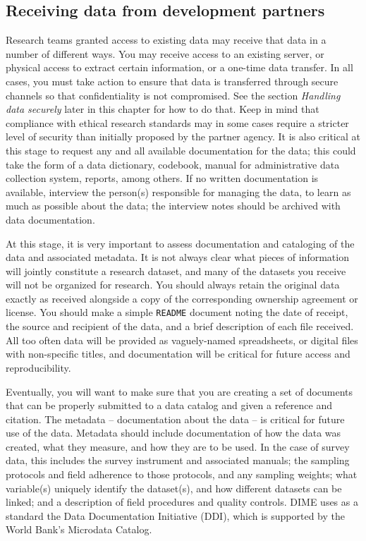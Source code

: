 \subsection{Receiving data from development partners}

Research teams granted access to existing data may receive that data in a number of different ways.
You may receive access to an existing server,
or physical access to extract certain information,
or a one-time data transfer.
In all cases, you must take action to ensure
that data is transferred through
secure channels so that confidentiality is not compromised.
See the section \textit{Handling data securely} later in this chapter for how to do that.
Keep in mind that compliance with ethical research standards may
in some cases require a stricter level of security than initially proposed by the partner agency.
It is also critical at this stage to request any and all available documentation for the data;
this could take the form of a data dictionary, codebook, 
manual for administrative data collection system, reports,
among others. 
If no written documentation is available, 
interview the person(s) responsible for managing the data,
to learn as much as possible about the data; 
the interview notes should be archived with data documentation.

At this stage, it is very important to assess
documentation and cataloging of the data and associated metadata.
It is not always clear what pieces of information will jointly constitute a research dataset,
and many of the datasets you receive will not be organized for research.
You should always retain the original data exactly as received
alongside a copy of the corresponding ownership agreement or license.
You should make a simple \texttt{README} document noting the date of receipt,
the source and recipient of the data,
and a brief description of each file received.
All too often data will be provided as vaguely-named spreadsheets,
or digital files with non-specific titles,
and documentation will be critical for future access and reproducibility.

Eventually, you will want to make sure that you are creating a set of documents
that can be properly submitted to a data catalog and given a reference and citation.
The metadata -- documentation about the data -- is critical for future use of the data.
Metadata should include documentation of how the data was created,
what they measure, and how they are to be used.
In the case of survey data, this includes the survey instrument and associated manuals;
the sampling protocols and field adherence to those protocols, and any sampling weights;
what variable(s) uniquely identify the dataset(s), and how different datasets can be linked;
and a description of field procedures and quality controls.
DIME uses as a standard the Data Documentation Initiative (DDI), which is supported by the
World Bank's Microdata Catalog.

